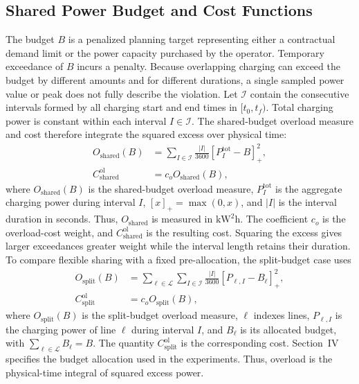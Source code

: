 \documentclass[conference]{IEEEtran}
\begin{document}
\subsection{Shared Power Budget and Cost Functions}
The budget $B$ is a penalized planning target representing either a contractual demand limit or the power capacity purchased by the operator. Temporary exceedance of $B$ incurs a penalty. Because overlapping charging can exceed the budget by different amounts and for different durations, a single sampled power value or peak does not fully describe the violation. Let $\mathcal{I}$ contain the consecutive intervals formed by all charging start and end times in $[t_0,t_f)$. Total charging power is constant within each interval $I\in\mathcal{I}$. The shared-budget overload measure and cost therefore integrate the squared excess over physical time:
\begin{align}
 O_{\mathrm{shared}}(B)&=\sum_{I\in\mathcal{I}}\frac{|I|}{3600}
 [P^{\mathrm{tot}}_I-B]_+^2,\\
 C^{\mathrm{ol}}_{\mathrm{shared}}&=c_oO_{\mathrm{shared}}(B),
\end{align}
where $O_{\mathrm{shared}}(B)$ is the shared-budget overload measure, $P^{\mathrm{tot}}_I$ is the aggregate charging power during interval $I$, $[x]_+=\max(0,x)$, and $|I|$ is the interval duration in seconds. Thus, $O_{\mathrm{shared}}$ is measured in $\mathrm{kW}^2\mathrm{h}$. The coefficient $c_o$ is the overload-cost weight, and $C^{\mathrm{ol}}_{\mathrm{shared}}$ is the resulting cost. Squaring the excess gives larger exceedances greater weight while the interval length retains their duration. To compare flexible sharing with a fixed pre-allocation, the split-budget case uses
\begin{align}
 O_{\mathrm{split}}(B)&=\sum_{\ell\in\mathcal{L}}\sum_{I\in\mathcal{I}}
 \frac{|I|}{3600}[P_{\ell,I}-B_\ell]_+^2,\\
 C^{\mathrm{ol}}_{\mathrm{split}}&=c_oO_{\mathrm{split}}(B),
\end{align}
where $O_{\mathrm{split}}(B)$ is the split-budget overload measure, $\ell$ indexes lines, $P_{\ell,I}$ is the charging power of line $\ell$ during interval $I$, and $B_\ell$ is its allocated budget, with $\sum_{\ell\in\mathcal{L}}B_\ell=B$. The quantity $C^{\mathrm{ol}}_{\mathrm{split}}$ is the corresponding cost. Section~IV specifies the budget allocation used in the experiments. Thus, overload is the physical-time integral of squared excess power.
\end{document}
